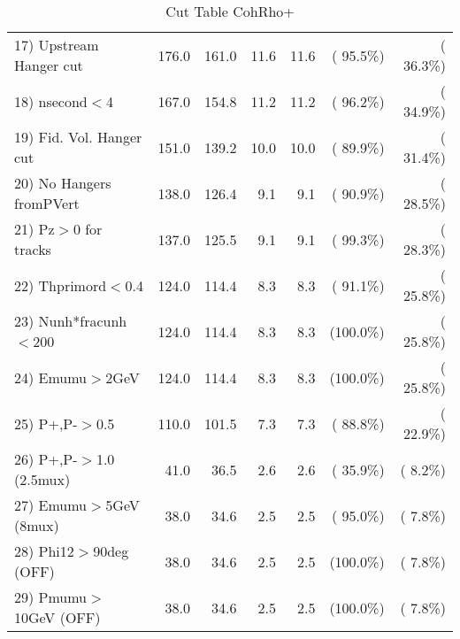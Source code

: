 \begin{table}[h!]
\begin{tabular}{||l||r|r|r|r|r|r||}
 17) Upstream Hanger cut  &        176.0 &        161.0 &         11.6 &         11.6 & ( 95.5\%) & ( 36.3\%) \\
 18) nsecond$<$4          &        167.0 &        154.8 &         11.2 &         11.2 & ( 96.2\%) & ( 34.9\%) \\
 19) Fid. Vol. Hanger cut &        151.0 &        139.2 &         10.0 &         10.0 & ( 89.9\%) & ( 31.4\%) \\
 20) No Hangers fromPVert &        138.0 &        126.4 &          9.1 &          9.1 & ( 90.9\%) & ( 28.5\%) \\
 21) Pz$>$0 for tracks    &        137.0 &        125.5 &          9.1 &          9.1 & ( 99.3\%) & ( 28.3\%) \\
 22) Thprimord$<$0.4      &        124.0 &        114.4 &          8.3 &          8.3 & ( 91.1\%) & ( 25.8\%) \\
 23) Nunh*fracunh$<$200   &        124.0 &        114.4 &          8.3 &          8.3 & (100.0\%) & ( 25.8\%) \\
 24) Emumu$>$2GeV         &        124.0 &        114.4 &          8.3 &          8.3 & (100.0\%) & ( 25.8\%) \\
 25) P+,P-$>$0.5          &        110.0 &        101.5 &          7.3 &          7.3 & ( 88.8\%) & ( 22.9\%) \\
 26) P+,P-$>$1.0 (2.5mux) &         41.0 &         36.5 &          2.6 &          2.6 & ( 35.9\%) & (  8.2\%) \\
 27) Emumu$>$5GeV  (8mux) &         38.0 &         34.6 &          2.5 &          2.5 & ( 95.0\%) & (  7.8\%) \\
 28) Phi12$>$90deg  (OFF) &         38.0 &         34.6 &          2.5 &          2.5 & (100.0\%) & (  7.8\%) \\
 29) Pmumu$>$10GeV  (OFF) &         38.0 &         34.6 &          2.5 &          2.5 & (100.0\%) & (  7.8\%) \\
 \hline
 \hline
 \end{tabular}
 \caption{Cut Table  CohRho+  }
 \label{tab-cutcohjpsi-mumu_anumunc}
 \end{table}
